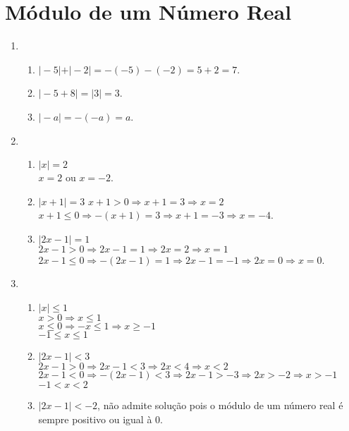 \documentclass[10pt]{book}
\begin{document}
\section{Módulo de um Número Real}
\begin{enumerate}
	\setcounter{enumi}{0}
	\item
	\begin{enumerate}
		\item
		$\vert-5\vert + \vert-2\vert = -(-5) - (-2) = 5 + 2 = 7$.
		\item
		$\vert-5 + 8\vert = \vert 3 \vert = 3$.
		\item
		$\vert-a\vert = -(-a) = a$.
	\end{enumerate}
	\item
	\begin{enumerate}
		\item
		$\vert x \vert = 2$\\
		$x = 2$ ou $x = - 2$.
		\item
		$\vert x + 1 \vert = 3$
		$x + 1 > 0 \Rightarrow x + 1 = 3 \Rightarrow x = 2$\\
		$x + 1 \leq 0 \Rightarrow -(x + 1) = 3 \Rightarrow x + 1 = -3 \Rightarrow x = -4$.
		\item
		$\vert 2x - 1 \vert = 1$\\
		$2x - 1 > 0 \Rightarrow 2x - 1 = 1 \Rightarrow 2x = 2 \Rightarrow x = 1$\\
		$2x - 1 \leq 0 \Rightarrow -(2x - 1) = 1 \Rightarrow 2x - 1 = -1 \Rightarrow 2x = 0 \Rightarrow x = 0$.		
	\end{enumerate}
	\item
	\begin{enumerate}
		\item
		$\vert x \vert \leq 1$\\
		$ x > 0 \Rightarrow x \leq 1$\\
		$ x \leq 0 \Rightarrow -x \leq 1 \Rightarrow x \geq -1$\\
		$-1 \leq x \leq 1$
		\item
		$\vert 2x - 1 \vert < 3$\\		
		$2x - 1 > 0 \Rightarrow 2x - 1 < 3 \Rightarrow 2x < 4 \Rightarrow x < 2$\\
		$2x - 1 < 0 \Rightarrow -(2x - 1) < 3 \Rightarrow 2x - 1 > -3  \Rightarrow 2x > -2 \Rightarrow x > -1$\\
		$-1 < x < 2$\\
		\item
		$\vert 2x - 1 \vert < -2$, não admite solução pois o módulo de um número real é sempre positivo ou igual à 0.

\end{enumerate}
\end{enumerate}
\end{document}
